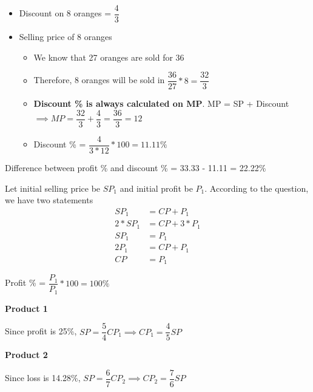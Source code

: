 \begin{itemize}
    \item Discount on 8 oranges = $\dfrac{4}{3}$
    \item Selling price of 8 oranges
    \begin{itemize}
        \item We know that 27 oranges are sold for 36
        \item Therefore, 8 oranges will be sold in $\dfrac{36}{27} * 8 = \dfrac{32}{3}$
        \item \textbf{Discount \% is always calculated on MP}. MP = SP + Discount $\implies MP = \dfrac{32}{3} + \dfrac{4}{3} = \dfrac{36}{3} = 12$
        \item Discount \% = $\dfrac{4}{3 * 12} * 100 = 11.11\%$
    \end{itemize}
\end{itemize}

Difference between profit \% and discount \% = 33.33 - 11.11 = 22.22\%



Let initial selling price be $SP_1$ and initial profit be $P_1$. According to the question, we have two statements
\begin{align}
    SP_1 &= CP + P_1 \\
    2 * SP_1 &= CP + 3 * P_1 \\
    SP_1 &= P_1 \tag{Subtract the above 2 equations} \\
    2P_1 &= CP + P_1 \tag{Substitute value of $SP_1$ in First equation} \\
    CP &= P_1
\end{align}

Profit \% = $\dfrac{P_1}{P_1} * 100 = 100\%$


\begin{multicols}{2}
    \textbf{Product 1}
    
    Since profit is 25\%, $SP = \dfrac{5}{4} CP_1 \implies CP_1 = \dfrac{4}{5} SP$
    
    \columnbreak
    \textbf{Product 2}
    
    Since loss is 14.28\%, $SP = \dfrac{6}{7} CP_2 \implies CP_2 = \dfrac{7}{6} SP$
    
\end{multicols}

